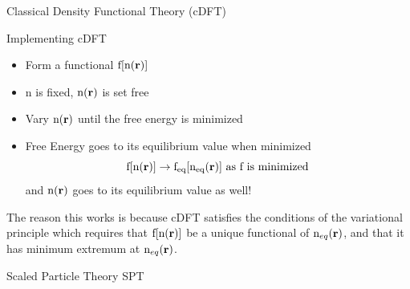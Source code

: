 \documentclass{beamer}
\renewcommand{\vec}[1]{\mathbf{#1}}
\begin{document}
\begin{frame}{Classical Density Functional Theory (cDFT)}
    \begin{block}{Implementing cDFT}
    \begin{itemize}
       \item Form a functional $\text f[\text n(\vec r)]$
       \item n is fixed, $\text n(\vec{r})$ is set free
       \item Vary $\text n(\vec{r})$ until the free energy is minimized 
       \item Free Energy goes to its equilibrium value when minimized      
       \begin{displaymath}\text f[\text n(\vec r)]\rightarrow \text f_{\text{eq}}[\text n_{\text{eq}}(\vec r)]  \mbox{ as f is minimized} \end{displaymath}
       and $\text n(\vec{r})$ goes to its equilibrium value as well!
       
     \end{itemize} 
     \end{block}
The reason this works is because cDFT satisfies the conditions 
of the variational principle which requires that  $\text f[\text n(\vec r)]$ 
be a unique functional of  $\text n_{eq}(\vec{r})$, and that it has 
minimum extremum at $\text n_{eq}(\vec{r})$.
\end{frame}

\begin{frame}{Scaled Particle Theory}
  SPT
\end{frame}
\end{document}
